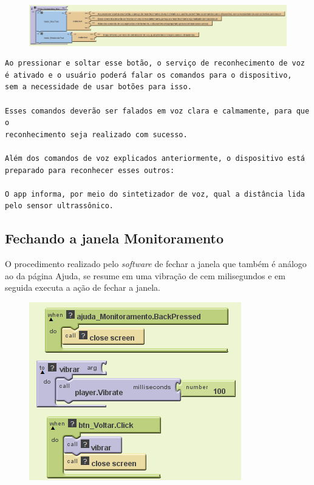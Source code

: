 \documentclass[portugues, brazil, a4paper,12pt]{article}
\begin{document}
\begin{figure}[H]
	\centering
	\includegraphics[scale=.6]{img/ajudaMonitoramento/voz.png}

\end{figure}
\begin{verbatim}
Ao pressionar e soltar esse botão, o serviço de reconhecimento de voz
é ativado e o usuário poderá falar os comandos para o dispositivo,
sem a necessidade de usar botões para isso.

Esses comandos deverão ser falados em voz clara e calmamente, para que o
reconhecimento seja realizado com sucesso.

Além dos comandos de voz explicados anteriormente, o dispositivo está
preparado para reconhecer esses outros:

O app informa, por meio do sintetizador de voz, qual a distância lida
pelo sensor ultrassônico.

\end{verbatim}

\subsection{Fechando a janela Monitoramento}
O procedimento realizado pelo \textit{software} de fechar a janela que também é análogo ao da página Ajuda, se resume em uma vibração de cem milisegundos e em seguida executa a ação de fechar a janela.

\begin{figure}[H]
	\centering
	\includegraphics[scale=.8]{img/ajudaMonitoramento/saida.png}
	
\end{figure}
\end{document}
